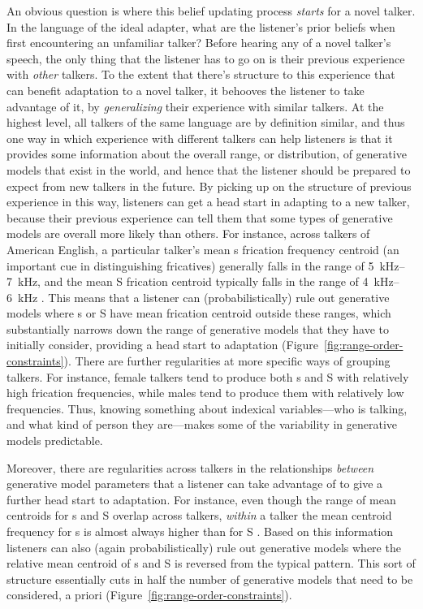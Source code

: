 An obvious question is where this belief updating process \emph{starts} for a novel talker. In the language of the ideal adapter, what are the listener's prior beliefs when first encountering an unfamiliar talker?  Before hearing any of a novel talker's speech, the only thing that the listener has to go on is their previous experience with \emph{other} talkers.  To the extent that there's structure to this experience that can benefit adaptation to a novel talker, it behooves the listener to take advantage of it, by \emph{generalizing} their experience with similar talkers.  At the highest level, all talkers of the same language are by definition similar, and thus one way in which experience with different talkers can help listeners is that it provides some information about the overall range, or distribution, of generative models that exist in the world, and hence that the listener should be prepared to expect from new talkers in the future.  By picking up on the structure of previous experience in this way, listeners can get a head start in adapting to a new talker, because their previous experience can tell them that some types of generative models are overall more likely than others.  For instance, across talkers of American English, a particular talker's mean \ph s frication frequency centroid (an important cue in distinguishing fricatives) generally falls in the range of \SIrange{5}{7}{\kilo\hertz}, and the mean \ph S frication centroid typically falls in the range of \SIrange{4}{6}{\kilo\hertz} \autocite{Newman2001}.  This means that a listener can (probabilistically) rule out generative models where \ph s or \ph S have mean frication centroid outside these ranges, which substantially narrows down the range of generative models that they have to initially consider, providing a head start to adaptation (Figure~\ref{fig:range-order-constraints}).  There are further regularities at more specific ways of grouping talkers.  For instance, female talkers tend to produce both \ph s and \ph S with relatively high frication frequencies, while males tend to produce them with relatively low frequencies.  Thus, knowing something about indexical variables---who is talking, and what kind of person they are---makes some of the variability in generative models predictable.

Moreover, there are regularities across talkers in the relationships \emph{between} generative model parameters that a listener can take advantage of to give a further head start to adaptation.  For instance, even though the range of mean centroids for \ph s and \ph S overlap across talkers, \emph{within} a talker the mean centroid frequency for \ph s is almost always higher than for \ph S \autocite{Newman2001}.  Based on this information listeners can also (again probabilistically) rule out generative models where the relative mean centroid of \ph s and \ph S is reversed from the typical pattern.  This sort of structure essentially cuts in half the number of generative models that need to be considered, a priori (Figure~\ref{fig:range-order-constraints}).  

